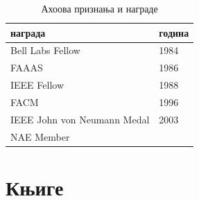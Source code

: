 \documentclass[a4paper]{article}
\begin{document}
\begin{table}[h!]
\begin{center}
\caption{Ахоова признања и награде}
\begin{tabular}{|l|l|} \hline
награда& година\\ \hline
Bell Labs Fellow &1984\\ \hline
FAAAS &1986\\ \hline
IEEE Fellow &1988\\ \hline
FACM &1996\\ \hline
IEEE John von Neumann Medal &2003\\ \hline
NAE Member &\\ \hline

\end{tabular}
\label{tab:tabela1}
\end{center}
\end{table}

\section{Књиге}

\label{sec:knjige}
\end{document}
